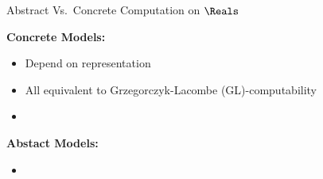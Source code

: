 \begin{frame}{Abstract Vs.\ Concrete Computation on $\Reals$}
    \begin{minipage}[t]{0.45\linewidth}
        \textbf{Concrete Models:}
        \begin{itemize}
            \item Depend on representation
            \item All equivalent to Grzegorczyk-Lacombe (GL)-computability
            \item
        \end{itemize}    
    \end{minipage}
    \pause
    \begin{minipage}[t]{0.45\linewidth}
        \textbf{Abstact Models:}
        \begin{itemize}
            \item 
        \end{itemize}
    \end{minipage}
\end{frame}